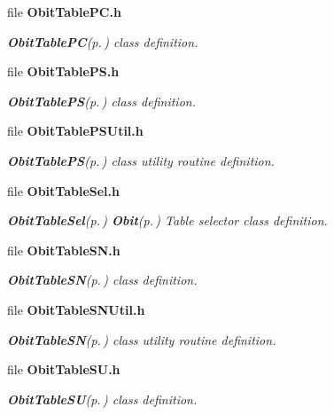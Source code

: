 \begin{CompactItemize}
\item 
file {\bf Obit\-Table\-PC.h}
\begin{CompactList}\small\item\em {\bf Obit\-Table\-PC}{\rm (p.\,\pageref{structObitTablePC})} class definition. \item\end{CompactList}

\item 
file {\bf Obit\-Table\-PS.h}
\begin{CompactList}\small\item\em {\bf Obit\-Table\-PS}{\rm (p.\,\pageref{structObitTablePS})} class definition. \item\end{CompactList}

\item 
file {\bf Obit\-Table\-PSUtil.h}
\begin{CompactList}\small\item\em {\bf Obit\-Table\-PS}{\rm (p.\,\pageref{structObitTablePS})} class utility routine definition. \item\end{CompactList}

\item 
file {\bf Obit\-Table\-Sel.h}
\begin{CompactList}\small\item\em {\bf Obit\-Table\-Sel}{\rm (p.\,\pageref{structObitTableSel})} {\bf Obit}{\rm (p.\,\pageref{structObit})} Table selector class definition. \item\end{CompactList}

\item 
file {\bf Obit\-Table\-SN.h}
\begin{CompactList}\small\item\em {\bf Obit\-Table\-SN}{\rm (p.\,\pageref{structObitTableSN})} class definition. \item\end{CompactList}

\item 
file {\bf Obit\-Table\-SNUtil.h}
\begin{CompactList}\small\item\em {\bf Obit\-Table\-SN}{\rm (p.\,\pageref{structObitTableSN})} class utility routine definition. \item\end{CompactList}

\item 
file {\bf Obit\-Table\-SU.h}
\begin{CompactList}\small\item\em {\bf Obit\-Table\-SU}{\rm (p.\,\pageref{structObitTableSU})} class definition. \item\end{CompactList}


\end{CompactItemize}

